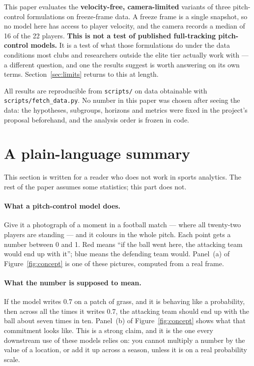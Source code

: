 \documentclass[11pt,a4paper]{article}
\begin{document}
\begin{plainbox}
\small
This paper evaluates the \textbf{velocity-free, camera-limited} variants of three
pitch-control formulations on freeze-frame data. A freeze frame is a single
snapshot, so no model here has access to player velocity, and the camera records
a median of 16 of the 22 players. \textbf{This is not a test of published
full-tracking pitch-control models.} It is a test of what those formulations do
under the data conditions most clubs and researchers outside the elite tier
actually work with --- a different question, and one the results suggest is worth
answering on its own terms. Section~\ref{sec:limits} returns to this at length.

All results are reproducible from \texttt{scripts/} on data obtainable with
\texttt{scripts/fetch\_data.py}. No number in this paper was chosen after seeing
the data: the hypotheses, subgroups, horizons and metrics were fixed in the
project's proposal beforehand, and the analysis order is frozen in code.
\end{plainbox}

\clearpage
\tableofcontents
\clearpage

\section{A plain-language summary}

This section is written for a reader who does not work in sports analytics. The
rest of the paper assumes some statistics; this part does not.

\paragraph{What a pitch-control model does.}
Give it a photograph of a moment in a football match --- where all twenty-two
players are standing --- and it colours in the whole pitch. Each point gets a
number between 0 and 1. Red means ``if the ball went here, the attacking team
would end up with it''; blue means the defending team would. Panel~(a) of
Figure~\ref{fig:concept} is one of these pictures, computed from a real frame.

\paragraph{What the number is supposed to mean.}
If the model writes 0.7 on a patch of grass, and it is behaving like a
probability, then across all the times it writes 0.7, the attacking team should
end up with the ball about seven times in ten. Panel~(b) of
Figure~\ref{fig:concept} shows what that commitment looks like. This is a strong
claim, and it is the one every downstream use of these models relies on: you
cannot multiply a number by the value of a location, or add it up across a
season, unless it is on a real probability scale.
\end{document}
